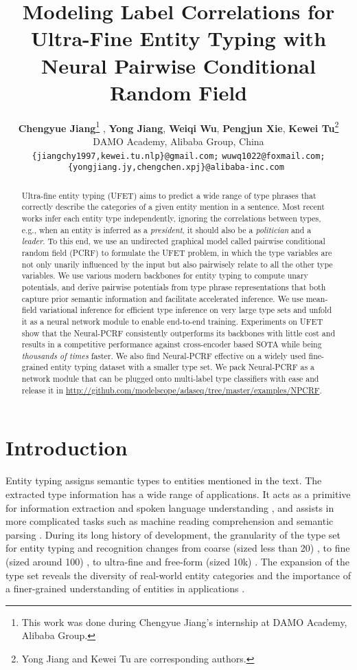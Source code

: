 \documentclass[11pt]{article}
\title{Modeling Label Correlations for Ultra-Fine Entity Typing with \\ Neural Pairwise Conditional Random Field}
\author{
    \textbf{Chengyue Jiang}\thanks{This work was done during Chengyue Jiang's internship at DAMO Academy, Alibaba Group. } ,
    \textbf{Yong Jiang}\damo,
    \textbf{Weiqi Wu},
    \textbf{Pengjun Xie}\damo,
    \textbf{Kewei Tu}\thanks{Yong Jiang and Kewei Tu are corresponding authors.} \\
\damo DAMO Academy, Alibaba Group, China \\
    \texttt{\{jiangchy1997,kewei.tu.nlp\}@gmail.com;}
    \texttt{wuwq1022@foxmail.com;}\\
    \texttt{\{yongjiang.jy,chengchen.xpj\}@alibaba-inc.com }
}
\newcommand{\code}{\url{http://github.com/modelscope/adaseq/tree/master/examples/NPCRF}}
\begin{document}
\maketitle

\begin{abstract}
    Ultra-fine entity typing (UFET) aims to predict a wide range of type phrases that correctly describe the categories of a given entity mention in a sentence. 
    Most recent works infer each entity type independently, ignoring the correlations between types, e.g., when an entity is inferred as a {\it president}, it should also be a {\it politician} and a {\it leader}.
    To this end, we use an undirected graphical model called pairwise conditional random field (PCRF) to formulate the UFET problem, in which the type variables are not only unarily influenced by the input but also pairwisely relate to all the other type variables.
    We use various modern backbones for entity typing to compute unary potentials, and derive pairwise potentials from type phrase representations that both capture prior semantic information and facilitate accelerated inference. We use mean-field variational inference for efficient type inference on very large type sets and unfold it as a neural network module to enable end-to-end training. 
    Experiments on UFET show that the Neural-PCRF consistently outperforms its backbones with little cost and results in a competitive performance against cross-encoder based SOTA while being \emph{thousands of times} faster. We also find Neural-PCRF effective on a widely used fine-grained entity typing dataset with a smaller type set. We pack Neural-PCRF as a network module that can be plugged onto multi-label type classifiers with ease and release it in \code.
\end{abstract}

  \section{Introduction}
Entity typing assigns semantic types to entities mentioned in the text. The extracted type information has a wide range of applications. It acts as a primitive for information extraction \cite{2phaseNER} and spoken language understanding \cite{coucke2018snips}, and assists in more complicated tasks such as machine reading comprehension \cite{joshi2017triviaqa} and semantic parsing \cite{yavuz-etal-2016-improving}.
During its long history of development, the granularity of the type set for entity typing and recognition changes from coarse (sized less than 20) \cite{conll03,06ontonotes}, to fine (sized around 100) \cite{bbn,figer,ontonotes,ding-etal-2021-nerd}, to ultra-fine and free-form (sized 10k) \cite{ufet}. The expansion of the type set reveals the diversity of real-world entity categories and the importance of a finer-grained understanding of entities in applications \cite{ufet}.
\end{document}
